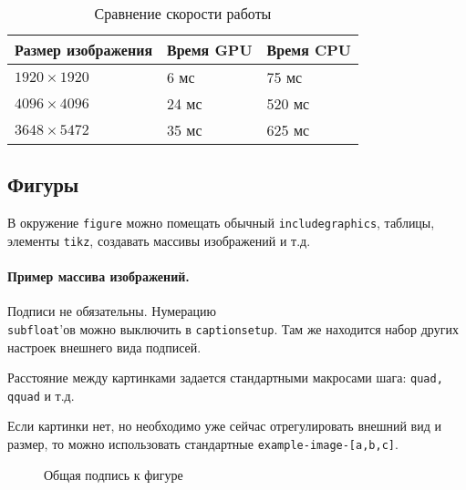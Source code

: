 \begin{table}[H]
	\centering
	\begin{tabularx}{\textwidth}{| X | X | X |}
		\hline
		\textbf{Размер изображения} & \textbf{Время GPU} & \textbf{Время CPU} \\ \hline
		$1920\times 1920$           & 6 мс               & 75 мс              \\ \hline
		$4096\times 4096$           & 24 мс              & 520 мс             \\ \hline
		$3648\times 5472$           & 35 мс              & 625 мс             \\ \hline
	\end{tabularx}
	\caption{Сравнение скорости работы}
\end{table}

\subsection{Фигуры}
В окружение \texttt{figure} можно помещать обычный \texttt{includegraphics}, таблицы, элементы \texttt{tikz}, создавать массивы изображений и т.д. 

\paragraph{Пример массива изображений.}
Подписи не обязательны. Нумерацию \\ \texttt{subfloat}'ов можно выключить в \texttt{captionsetup}. Там же находится набор других настроек внешнего вида подписей.

Расстояние между картинками задается стандартными макросами шага: \texttt{quad, qquad} и т.д.

Если картинки нет, но необходимо уже сейчас отрегулировать внешний вид и размер, то можно использовать стандартные \texttt{example-image-[a,b,c]}.

\begin{figure}[H]
	\centering
	\captionsetup[subfigure]{justification=centering}
	\quad
	\quad
	\quad
	\caption{Общая подпись к фигуре}
\end{figure}
